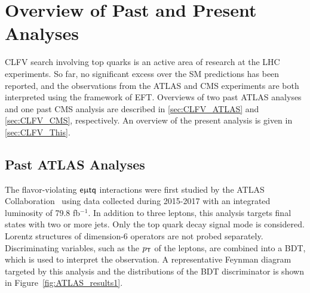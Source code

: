 \chapter{Overview of Past and Present Analyses}
\label{chap:History}

\ac{CLFV} search involving top quarks is an active area of research at the \ac{LHC} experiments. So far, no significant excess over the \ac{SM} predictions has been reported, and the observations from the \ac{ATLAS} and \ac{CMS} experiments are both interpreted using the framework of \ac{EFT}. Overviews of two past \ac{ATLAS} analyses and one past \ac{CMS} analysis are described in \autoref{sec:CLFV_ATLAS} and \autoref{sec:CLFV_CMS}, respectively. An overview of the present analysis is given in \autoref{sec:CLFV_This}.

\section{Past ATLAS Analyses}
\label{sec:CLFV_ATLAS}

The flavor-violating $\textsf{e}\upmu\textsf{t{q}}$ interactions were first studied by the \ac{ATLAS} Collaboration~\cite{ATLAS-CONF-2018-044} using data collected during 2015-2017 with an integrated luminosity of 79.8 fb$^{-1}$. In addition to three leptons, this analysis targets final states with two or more jets. Only the top quark decay signal mode is considered. Lorentz structures of dimension-6 operators are not probed separately. Discriminating variables, such as the $p_{\textsf{T}}$ of the leptons, are combined into a \ac{BDT}, which is used to interpret the observation. A representative Feynman diagram targeted by this analysis and the distributions of the \ac{BDT} discriminator is shown in Figure~\ref{fig:ATLAS_results1}.

